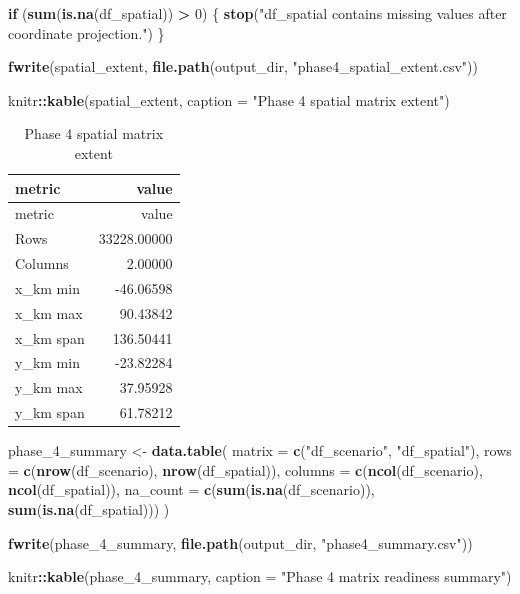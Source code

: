 \documentclass[
]{article}
\newenvironment{Shaded}{\begin{snugshade}}{\end{snugshade}}
\newcommand{\AttributeTok}[1]{\textcolor[rgb]{0.13,0.29,0.53}{#1}}
\newcommand{\ControlFlowTok}[1]{\textcolor[rgb]{0.13,0.29,0.53}{\textbf{#1}}}
\newcommand{\DecValTok}[1]{\textcolor[rgb]{0.00,0.00,0.81}{#1}}
\newcommand{\FunctionTok}[1]{\textcolor[rgb]{0.13,0.29,0.53}{\textbf{#1}}}
\newcommand{\NormalTok}[1]{#1}
\newcommand{\OtherTok}[1]{\textcolor[rgb]{0.56,0.35,0.01}{#1}}
\newcommand{\SpecialCharTok}[1]{\textcolor[rgb]{0.81,0.36,0.00}{\textbf{#1}}}
\newcommand{\StringTok}[1]{\textcolor[rgb]{0.31,0.60,0.02}{#1}}
\begin{document}
\begin{Shaded}
\begin{Highlighting}[]
\ControlFlowTok{if}\NormalTok{ (}\FunctionTok{sum}\NormalTok{(}\FunctionTok{is.na}\NormalTok{(df\_spatial)) }\SpecialCharTok{\textgreater{}} \DecValTok{0}\NormalTok{) \{}
  \FunctionTok{stop}\NormalTok{(}\StringTok{"df\_spatial contains missing values after coordinate projection."}\NormalTok{)}
\NormalTok{\}}

\FunctionTok{fwrite}\NormalTok{(spatial\_extent, }\FunctionTok{file.path}\NormalTok{(output\_dir, }\StringTok{"phase4\_spatial\_extent.csv"}\NormalTok{))}

\NormalTok{knitr}\SpecialCharTok{::}\FunctionTok{kable}\NormalTok{(spatial\_extent, }\AttributeTok{caption =} \StringTok{"Phase 4 spatial matrix extent"}\NormalTok{)}
\end{Highlighting}
\end{Shaded}

\begin{longtable}[]{@{}lr@{}}
\caption{Phase 4 spatial matrix extent}\tabularnewline
\toprule\noalign{}
metric & value \\
\midrule\noalign{}
\endfirsthead
\toprule\noalign{}
metric & value \\
\midrule\noalign{}
\endhead
\bottomrule\noalign{}
\endlastfoot
Rows & 33228.00000 \\
Columns & 2.00000 \\
x\_km min & -46.06598 \\
x\_km max & 90.43842 \\
x\_km span & 136.50441 \\
y\_km min & -23.82284 \\
y\_km max & 37.95928 \\
y\_km span & 61.78212 \\
\end{longtable}

\begin{Shaded}
\begin{Highlighting}[]
\NormalTok{phase\_4\_summary }\OtherTok{\textless{}{-}} \FunctionTok{data.table}\NormalTok{(}
  \AttributeTok{matrix =} \FunctionTok{c}\NormalTok{(}\StringTok{"df\_scenario"}\NormalTok{, }\StringTok{"df\_spatial"}\NormalTok{),}
  \AttributeTok{rows =} \FunctionTok{c}\NormalTok{(}\FunctionTok{nrow}\NormalTok{(df\_scenario), }\FunctionTok{nrow}\NormalTok{(df\_spatial)),}
  \AttributeTok{columns =} \FunctionTok{c}\NormalTok{(}\FunctionTok{ncol}\NormalTok{(df\_scenario), }\FunctionTok{ncol}\NormalTok{(df\_spatial)),}
  \AttributeTok{na\_count =} \FunctionTok{c}\NormalTok{(}\FunctionTok{sum}\NormalTok{(}\FunctionTok{is.na}\NormalTok{(df\_scenario)), }\FunctionTok{sum}\NormalTok{(}\FunctionTok{is.na}\NormalTok{(df\_spatial)))}
\NormalTok{)}

\FunctionTok{fwrite}\NormalTok{(phase\_4\_summary, }\FunctionTok{file.path}\NormalTok{(output\_dir, }\StringTok{"phase4\_summary.csv"}\NormalTok{))}

\NormalTok{knitr}\SpecialCharTok{::}\FunctionTok{kable}\NormalTok{(phase\_4\_summary, }\AttributeTok{caption =} \StringTok{"Phase 4 matrix readiness summary"}\NormalTok{)}
\end{Highlighting}
\end{Shaded}
\end{document}
